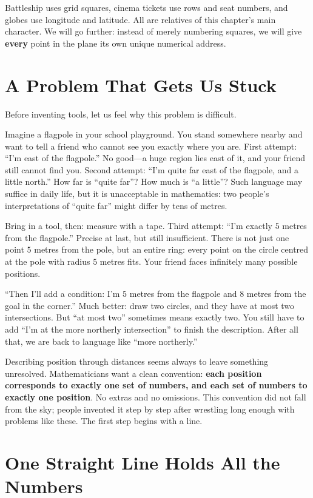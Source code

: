 Battleship uses grid squares, cinema tickets use rows and seat numbers, and globes use longitude and latitude. All are relatives of this chapter's main character. We will go further: instead of merely numbering squares, we will give \textbf{every} point in the plane its own unique numerical address.

\section{A Problem That Gets Us Stuck}

Before inventing tools, let us feel why this problem is difficult.

Imagine a flagpole in your school playground. You stand somewhere nearby and want to tell a friend who cannot see you exactly where you are. First attempt: ``I'm east of the flagpole.'' No good---a huge region lies east of it, and your friend still cannot find you. Second attempt: ``I'm quite far east of the flagpole, and a little north.'' How far is ``quite far''? How much is ``a little''? Such language may suffice in daily life, but it is unacceptable in mathematics: two people's interpretations of ``quite far'' might differ by tens of metres.

Bring in a tool, then: measure with a tape. Third attempt: ``I'm exactly $5$ metres from the flagpole.'' Precise at last, but still insufficient. There is not just one point $5$ metres from the pole, but an entire ring: every point on the circle centred at the pole with radius $5$ metres fits. Your friend faces infinitely many possible positions.

``Then I'll add a condition: I'm $5$ metres from the flagpole and $8$ metres from the goal in the corner.'' Much better: draw two circles, and they have at most two intersections. But ``at most two'' sometimes means exactly two. You still have to add ``I'm at the more northerly intersection'' to finish the description. After all that, we are back to language like ``more northerly.''

Describing position through distances seems always to leave something unresolved. Mathematicians want a clean convention: \textbf{each position corresponds to exactly one set of numbers, and each set of numbers to exactly one position}. No extras and no omissions. This convention did not fall from the sky; people invented it step by step after wrestling long enough with problems like these. The first step begins with a line.

\section{One Straight Line Holds All the Numbers}

